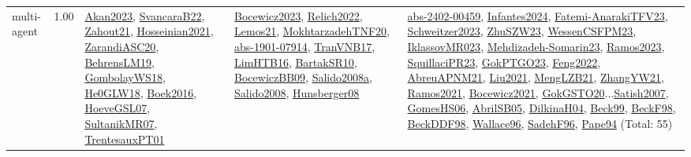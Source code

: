 {\begin{longtable}{p{3cm}r>{\raggedright\arraybackslash}p{6cm}>{\raggedright\arraybackslash}p{6cm}>{\raggedright\arraybackslash}p{8cm}}
\index{multi-agent}\index{Concepts!multi-agent}multi-agent &  1.00 & \hyperref[detail:Akan2023]{Akan2023}, \hyperref[detail:SvancaraB22]{SvancaraB22}, \hyperref[detail:Zahout21]{Zahout21}, \hyperref[detail:Hosseinian2021]{Hosseinian2021}, \hyperref[detail:ZarandiASC20]{ZarandiASC20}, \hyperref[detail:BehrensLM19]{BehrensLM19}, \hyperref[detail:GombolayWS18]{GombolayWS18}, \hyperref[detail:He0GLW18]{He0GLW18}, \hyperref[detail:Boek2016]{Boek2016}, \hyperref[detail:HoeveGSL07]{HoeveGSL07}, \hyperref[detail:SultanikMR07]{SultanikMR07}, \hyperref[detail:TrentesauxPT01]{TrentesauxPT01} & \hyperref[detail:Bocewicz2023]{Bocewicz2023}, \hyperref[detail:Relich2022]{Relich2022}, \hyperref[detail:Lemos21]{Lemos21}, \hyperref[detail:MokhtarzadehTNF20]{MokhtarzadehTNF20}, \hyperref[detail:abs-1901-07914]{abs-1901-07914}, \hyperref[detail:TranVNB17]{TranVNB17}, \hyperref[detail:LimHTB16]{LimHTB16}, \hyperref[detail:BartakSR10]{BartakSR10}, \hyperref[detail:BocewiczBB09]{BocewiczBB09}, \hyperref[detail:Salido2008a]{Salido2008a}, \hyperref[detail:Salido2008]{Salido2008}, \hyperref[detail:Hunsberger08]{Hunsberger08} & \hyperref[detail:abs-2402-00459]{abs-2402-00459}, \hyperref[detail:Infantes2024]{Infantes2024}, \hyperref[detail:Fatemi-AnarakiTFV23]{Fatemi-AnarakiTFV23}, \hyperref[detail:Schweitzer2023]{Schweitzer2023}, \hyperref[detail:ZhuSZW23]{ZhuSZW23}, \hyperref[detail:WessenCSFPM23]{WessenCSFPM23}, \hyperref[detail:IklassovMR023]{IklassovMR023}, \hyperref[detail:Mehdizadeh-Somarin23]{Mehdizadeh-Somarin23}, \hyperref[detail:Ramos2023]{Ramos2023}, \hyperref[detail:SquillaciPR23]{SquillaciPR23}, \hyperref[detail:GokPTGO23]{GokPTGO23}, \hyperref[detail:Feng2022]{Feng2022}, \hyperref[detail:AbreuAPNM21]{AbreuAPNM21}, \hyperref[detail:Liu2021]{Liu2021}, \hyperref[detail:MengLZB21]{MengLZB21}, \hyperref[detail:ZhangYW21]{ZhangYW21}, \hyperref[detail:Ramos2021]{Ramos2021}, \hyperref[detail:Bocewicz2021]{Bocewicz2021}, \hyperref[detail:GokGSTO20]{GokGSTO20}...\hyperref[detail:Satish2007]{Satish2007}, \hyperref[detail:GomesHS06]{GomesHS06}, \hyperref[detail:AbrilSB05]{AbrilSB05}, \hyperref[detail:DilkinaH04]{DilkinaH04}, \hyperref[detail:Beck99]{Beck99}, \hyperref[detail:BeckF98]{BeckF98}, \hyperref[detail:BeckDDF98]{BeckDDF98}, \hyperref[detail:Wallace96]{Wallace96}, \hyperref[detail:SadehF96]{SadehF96}, \hyperref[detail:Pape94]{Pape94} (Total: 55)\\

\end{longtable}}
